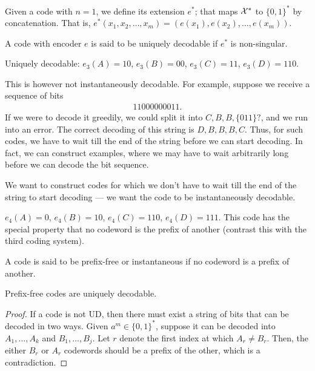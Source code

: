 \documentclass[12pt]{article}
\begin{document}
\begin{definition}
\label{def:extension-and-unique-decodability}
Given a code with $n=1$, we define its extension $e^*$; that maps ${\cal X}^*$ to $\{0, 1\}^*$ by concatenation. That is, $e^*(x_1, x_2, \ldots, x_m) = (e(x_1), e(x_2), \ldots, e(x_m))$. 


A code with encoder $e$ is said to be uniquely decodable if $e^*$ is non-singular. 
\end{definition}

\begin{example}
\label{example:variable-rate-code-3} 
Uniquely decodable: $e_3(A) = 10$, $e_3(B)=00$, $e_3(C)=11$, $e_3(D)=110$. 

This is however not instantaneously decodable. For example, suppose we receive a sequence of bits 
\begin{align}
11000000011. 
\end{align}
If we were to decode it greedily, we could split it into $C, B, B, \{011\}?$, and we run into an error. The correct decoding of this string is $D, B, B, B, C$. 
Thus, for such codes, we have to wait till the end of the string before we can start decoding. In fact, we can construct examples, where we may have to wait arbitrarily long before we can decode the bit sequence. 
\end{example}

We want to construct codes for which we don't have to wait till the end of the string to start decoding --- we want the code to be instantaneously decodable. 

\begin{example}
\label{example:variable-rate-code-4}
$e_4(A) = 0$, $e_4(B)=10$, $e_4(C)=110$, $e_4(D)=111$. This code has the special property that no codeword is the prefix of another (contrast this with the third coding system). 
\end{example}

\begin{definition}
\label{def:prefix-free} A code is said to be prefix-free or instantaneous if no codeword is a prefix of another. 
\end{definition}

\begin{claim}
Prefix-free codes are uniquely decodable. 
\end{claim}

\begin{proof}
If a code is not UD, then there must exist a string of bits that can be decoded in two ways. Given $a^m \in \{0, 1\}^*$, suppose it can be decoded into $A_1, \ldots, A_k$ and $B_1, \ldots, B_j$. Let $r$ denote the first index at which $A_r \neq B_r$. Then, the either $B_r$ or $A_r$ codewords should be a prefix of the other, which is a contradiction. 
\end{proof}
\end{document}
